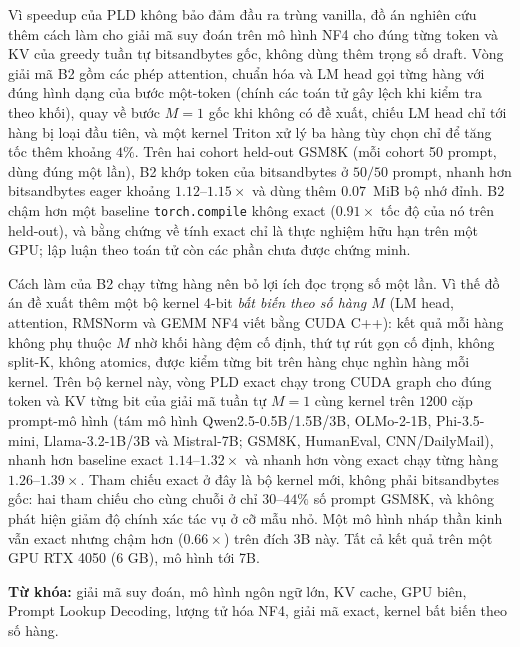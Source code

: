 Vì speedup của PLD không bảo đảm đầu ra trùng vanilla, đồ án nghiên cứu thêm cách làm cho giải mã suy đoán trên mô hình NF4 cho đúng từng token và KV của greedy tuần tự bitsandbytes gốc, không dùng thêm trọng số draft. Vòng giải mã B2 gồm các phép attention, chuẩn hóa và LM head gọi từng hàng với đúng hình dạng của bước một-token (chính các toán tử gây lệch khi kiểm tra theo khối), quay về bước $M{=}1$ gốc khi không có đề xuất, chiếu LM head chỉ tới hàng bị loại đầu tiên, và một kernel Triton xử lý ba hàng tùy chọn chỉ để tăng tốc thêm khoảng $4\%$. Trên hai cohort held-out GSM8K (mỗi cohort 50 prompt, dùng đúng một lần), B2 khớp token của bitsandbytes ở $50/50$ prompt, nhanh hơn bitsandbytes eager khoảng $1.12$--$1.15\times$ và dùng thêm $0.07$~MiB bộ nhớ đỉnh. B2 chậm hơn một baseline \texttt{torch.compile} không exact ($0.91\times$ tốc độ của nó trên held-out), và bằng chứng về tính exact chỉ là thực nghiệm hữu hạn trên một GPU; lập luận theo toán tử còn các phần chưa được chứng minh.

Cách làm của B2 chạy từng hàng nên bỏ lợi ích đọc trọng số một lần. Vì thế đồ án đề xuất thêm một bộ kernel 4-bit \emph{bất biến theo số hàng $M$} (LM head, attention, RMSNorm và GEMM NF4 viết bằng CUDA C++): kết quả mỗi hàng không phụ thuộc $M$ nhờ khối hàng đệm cố định, thứ tự rút gọn cố định, không split-K, không atomics, được kiểm từng bit trên hàng chục nghìn hàng mỗi kernel. Trên bộ kernel này, vòng PLD exact chạy trong CUDA graph cho đúng token và KV từng bit của giải mã tuần tự $M{=}1$ cùng kernel trên $1200$ cặp prompt-mô hình (tám mô hình Qwen2.5-0.5B/1.5B/3B, OLMo-2-1B, Phi-3.5-mini, Llama-3.2-1B/3B và Mistral-7B; GSM8K, HumanEval, CNN/DailyMail), nhanh hơn baseline exact $1.14$--$1.32\times$ và nhanh hơn vòng exact chạy từng hàng $1.26$--$1.39\times$. Tham chiếu exact ở đây là bộ kernel mới, không phải bitsandbytes gốc: hai tham chiếu cho cùng chuỗi ở chỉ $30$--$44\%$ số prompt GSM8K, và không phát hiện giảm độ chính xác tác vụ ở cỡ mẫu nhỏ. Một mô hình nháp thần kinh vẫn exact nhưng chậm hơn ($0.66\times$) trên đích 3B này. Tất cả kết quả trên một GPU RTX 4050 (6 GB), mô hình tới 7B.

\vspace{0.5cm}
\noindent\textbf{Từ khóa:} giải mã suy đoán, mô hình ngôn ngữ lớn, KV cache, GPU biên, Prompt Lookup Decoding, lượng tử hóa NF4, giải mã exact, kernel bất biến theo số hàng.
